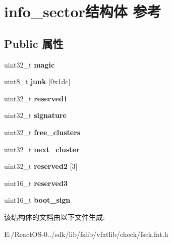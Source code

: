 \hypertarget{structinfo__sector}{}\section{info\+\_\+sector结构体 参考}
\label{structinfo__sector}
\subsection*{Public 属性}
\begin{DoxyCompactItemize}
\item 
\mbox{\label{structinfo__sector_a32af42d3e38fb104ed35ec9ded347c7f}} 
uint32\+\_\+t {\bfseries magic}
\item 
\mbox{\label{structinfo__sector_add6ca3ee8c717a19eed0bea75b6279a2}} 
uint8\+\_\+t {\bfseries junk} \mbox{[}0x1dc\mbox{]}
\item 
\mbox{\label{structinfo__sector_a379cbdbcaa1a67d8bad3d8e11d4f6523}} 
uint32\+\_\+t {\bfseries reserved1}
\item 
\mbox{\label{structinfo__sector_a33baf3dca6f7a7ee8823da338a2536b7}} 
uint32\+\_\+t {\bfseries signature}
\item 
\mbox{\label{structinfo__sector_aec999d7ab755510073c3804337c051dc}} 
uint32\+\_\+t {\bfseries free\+\_\+clusters}
\item 
\mbox{\label{structinfo__sector_abdd39c9366aef842979d29c64ff834d1}} 
uint32\+\_\+t {\bfseries next\+\_\+cluster}
\item 
\mbox{\label{structinfo__sector_ae85299eb82f7ff296c9bf905c855dc99}} 
uint32\+\_\+t {\bfseries reserved2} \mbox{[}3\mbox{]}
\item 
\mbox{\label{structinfo__sector_a12ec462ec1a399a031443b7096f709ae}} 
uint16\+\_\+t {\bfseries reserved3}
\item 
\mbox{\label{structinfo__sector_a8bd8d3b5b581d12cdd7dcaf8bd500e40}} 
uint16\+\_\+t {\bfseries boot\+\_\+sign}
\end{DoxyCompactItemize}


该结构体的文档由以下文件生成\+:\begin{DoxyCompactItemize}
\item 
E\+:/\+React\+O\+S-\/0../sdk/lib/fslib/vfatlib/check/fsck.\+fat.\+h\end{DoxyCompactItemize}
